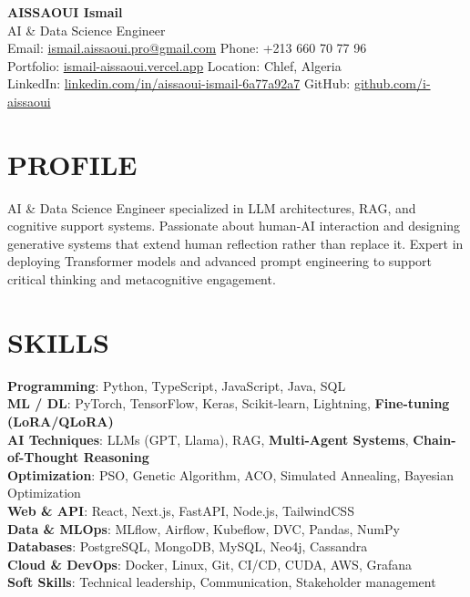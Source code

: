\documentclass[a4paper,12pt]{article}
\begin{document}
\begin{center}
    {\Huge\bfseries\color{titleblue} AISSAOUI Ismail}\\[4pt]
    {\Large AI \& Data Science Engineer}\\[6pt]

    {\normalsize
    Email: \href{mailto:ismail.aissaoui.pro@gmail.com}{ismail.aissaoui.pro@gmail.com} \quad
    Phone: +213 660 70 77 96 \\
    Portfolio: \href{https://ismail-aissaoui.vercel.app}{ismail-aissaoui.vercel.app} \quad
    Location: Chlef, Algeria \\
    LinkedIn: \href{https://linkedin.com/in/aissaoui-ismail-6a77a92a7}{linkedin.com/in/aissaoui-ismail-6a77a92a7} \quad
    GitHub: \href{https://github.com/i-aissaoui}{github.com/i-aissaoui}
    }
\end{center}

\section{PROFILE}
AI \& Data Science Engineer specialized in LLM architectures, RAG, and cognitive support systems. Passionate about human-AI interaction and designing generative systems that extend human reflection rather than replace it. Expert in deploying Transformer models and advanced prompt engineering to support critical thinking and metacognitive engagement.

\section{SKILLS}
\setlength{\parskip}{-1pt}
{\normalsize
\textbf{Programming}: Python, TypeScript, JavaScript, Java, SQL \\

\textbf{ML / DL}: PyTorch, TensorFlow, Keras, Scikit-learn, Lightning, \textbf{Fine-tuning (LoRA/QLoRA)} \\

\textbf{AI Techniques}: LLMs (GPT, Llama), RAG, \textbf{Multi-Agent Systems}, \textbf{Chain-of-Thought Reasoning} \\

\textbf{Optimization}: PSO, Genetic Algorithm, ACO, Simulated Annealing, Bayesian Optimization \\

\textbf{Web \& API}: React, Next.js, FastAPI, Node.js, TailwindCSS \\

\textbf{Data \& MLOps}: MLflow, Airflow, Kubeflow, DVC, Pandas, NumPy \\

\textbf{Databases}: PostgreSQL, MongoDB, MySQL, Neo4j, Cassandra \\

\textbf{Cloud \& DevOps}: Docker, Linux, Git, CI/CD, CUDA, AWS, Grafana \\

\textbf{Soft Skills}: Technical leadership, Communication, Stakeholder management
}
\end{document}
